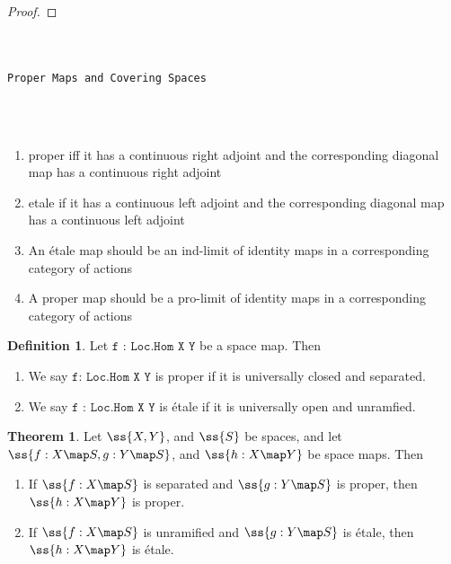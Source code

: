 \documentclass{book}
\theoremstyle{definition}
\newtheorem{definition}{Definition}
\newtheorem{theorem}{Theorem}
\renewcommand{\chapter}[1]{
\newpage
{
\Huge 
\begin{center}
\ \\
\ \\
\thispagestyle{empty}
\texttt{#1}
\end{center}}
\ \\
\ \\
}
\begin{document}
\begin{proof}

\end{proof}

\chapter{Proper Maps and Covering Spaces}

\begin{enumerate}
\item proper iff it has a continuous right adjoint and the corresponding diagonal map has a continuous right adjoint
\item etale if it has a continuous left adjoint and the corresponding diagonal map has a continuous left adjoint
\item An étale map should be an ind-limit of identity maps in a corresponding category of actions
\item A proper map should be a pro-limit of identity maps in a corresponding category of actions
\end{enumerate}


\begin{definition}
Let $\texttt{f : Loc.Hom X Y}$ be a space map. Then
\begin{enumerate}
\item We say $\texttt{f: Loc.Hom X Y}$ is proper if it is universally closed and separated.
\item We say $\texttt{f : Loc.Hom X Y}$ is étale if it is universally open and unramfied.
\end{enumerate}
\end{definition}

\begin{theorem}
Let $\ss{X, Y}$, and $\ss{S}$ be spaces, and let $\ss{f : X \map S, g : Y \map S}$, and $\ss{h : X \map Y}$ be space maps. Then
\begin{enumerate}
\item If $\ss{f : X \map S}$ is separated and $\ss{g : Y \map S}$ is proper, then $\ss{h : X \map Y}$ is proper.
\item If $\ss{f : X \map S}$ is unramified and $\ss{g : Y \map S}$ is étale, then $\ss{h : X \map Y}$ is étale.
\end{enumerate}
\end{theorem}

\end{document}
